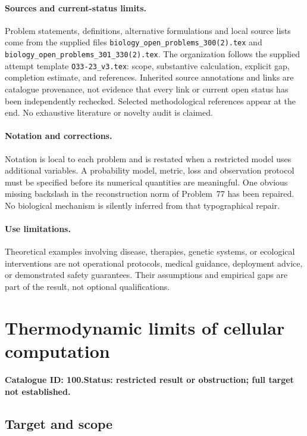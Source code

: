 \documentclass[11pt]{article}
\begin{document}
\paragraph{Sources and current-status limits.}
Problem statements, definitions, alternative formulations and local source lists
come from the supplied files
\texttt{biology\_open\_problems\_300(2).tex} and
\texttt{biology\_open\_problems\_301\_330(2).tex}.
The organization follows the supplied attempt template
\texttt{O33-23\_v3.tex}: scope, substantive calculation, explicit gap,
completion estimate, and references. Inherited source annotations and links are
catalogue provenance, not evidence that every link or current open status has
been independently rechecked. Selected methodological references appear at the
end. No exhaustive literature or novelty audit is claimed.

\paragraph{Notation and corrections.}
Notation is local to each problem and is restated when a restricted model uses
additional variables. A probability model, metric, loss and observation protocol
must be specified before its numerical quantities are meaningful. One obvious
missing backslash in the reconstruction norm of Problem~77 has been repaired.
No biological mechanism is silently inferred from that typographical repair.

\paragraph{Use limitations.}
Theoretical examples involving disease, therapies, genetic systems, or ecological
interventions are not operational protocols, medical guidance, deployment advice,
or demonstrated safety guarantees. Their assumptions and empirical gaps are part
of the result, not optional qualifications.

\setcounter{section}{99}
\section{Thermodynamic limits of cellular computation}
\label{prob:100}
\noindent\textbf{Catalogue ID: 100.}\quad \textbf{Status: restricted result or obstruction; full target not established.}
\subsection{Target and scope}
\end{document}
